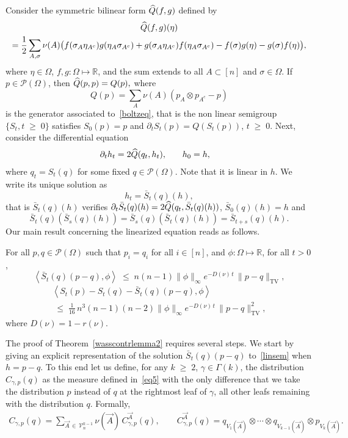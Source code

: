 \documentclass[AHL,Unicode,longabstracts,published]{cedram}
\renewcommand{\leq}{\;\leqslant\;}
\renewcommand{\geq}{\;\geqslant\;}
\newcommand{\Om}{\Omega}
\newcommand{\si}{\sigma}
\newcommand{\tv}{\mathrm{TV}}
\newcommand{\cP}{\mathcal{P}}
\newcommand{\cV}{\mathcal{V}}
\newcommand{\bbR}{\mathbb{R}}
\let\g=\gamma
\let\G=\Gamma
\let\O=\Omega
\let\oldhat\hat
\renewcommand*{\hat}[1]{\mathchoice{\widehat{#1}}{\widehat{#1}}{\oldhat{#1}}{\oldhat{#1}}}
\begin{document}
Consider the symmetric bilinear form $\hat{Q}(f,g)$ defined by
\begin{multline}
 \hat{Q}(f,g)(\eta)\\
=
\frac{1}{2}\sum_{A,\si}
\nu(A)\big(f(\sigma_{A} \eta_{A^c}) g(\eta_{A}\sigma_{A^c}) + g(\sigma_{A} \eta_{A^c})f(\eta_{A}\sigma_{A^c}) - f(\sigma)g(\eta)- g(\sigma)f(\eta)\big),
\end{multline}
where $\eta \in \Om$, $f,g:\O\mapsto\bbR$, and the sum extends to all $A \subset [n]$ and $\si \in \O$.
If $p \in \cP(\O)$, then $\hat{Q}(p,p) = Q(p),$ where
\[
Q(p)=\sum_A\nu(A)(p_A\otimes p_{A^c} - p)
\]
is the generator associated to~\eqref{boltzeq}, that is the non linear semigroup $\{S_t, t \geq 0\}$ satisfies $S_0 (p)= p$ and $\partial_t S_t (p)= Q (S_t (p))$, $t\geq 0$.
Next, consider the differential equation
\begin{align}\label{linsem}
&\partial_t h_t = 2\hat{Q}(q_t,h_t), \ \ \ \;\;\; h_0=h,
\end{align}
where $q_t = S_t(q)$ for some fixed $ q \in \cP(\O)$. Note that it is linear in $h$.
We write its unique solution as
\[
h_t=\bar{S}_t(q)(h),
\]
that is $\bar{S}_t(q)(h)$ verifies $\partial_t \bar{S}_t(q)(h) = 2\hat{Q}(q_t,\bar{S}_t(q)(h))$, $\bar{S}_0(q)(h)=h$ and
\[
\bar{S}_t(q)(\bar{S}_s(q)(h)) = \bar{S}_s(q)(\bar{S}_t(q)(h)) = \bar{S}_{t+s}(q)(h).
\]
Our main result concerning the linearized equation reads as follows.

\begin{theo}\label{wasscontrlemma2}
For all $p,q \in \cP(\O)$ such that $p_{i} = q_{i}$ for all $i \in [n]$, and $\phi:\O\mapsto\bbR$, for all $t>0$,
\begin{equation}\label{nonlincont2}
\left\langle \bar{S}_t(q)(p-q),\phi\right\rangle  \leq n(n-1)\|\phi\|_{\infty}e^{-D(\nu) \,t}\,\|p-q\|_\tv,
\end{equation}
\begin{multline}\label{nonlincont3}
\left\langle S_t(p)-S_t(q)-\bar{S}_t(q)(p-q),\phi\right\rangle \\
\leq \frac1{16}\,n^3(n-1)(n-2) \|\phi\|_{\infty}e^{-D(\nu) \,t}\,\|p-q\|_\tv^2, 
\end{multline}
where $D(\nu)= 1-r(\nu)$.
\end{theo}

The proof of Theorem~\ref{wasscontrlemma2} requires several steps. We start by giving an explicit representation of the solution $\bar{S}_t(q)(p-q)$ to~\eqref{linsem} when $h=p-q$. To this end let us define, for any $k\geq 2$, $\g\in\G(k)$, the distribution $C_{\gamma, p}(q)$ as the measure defined in~\eqref{eq5} with the only difference that we take the distribution $p$ instead of $q$ at the rightmost leaf of $\g$, all other leafs remaining with the distribution $q$. Formally,
\begin{align}\label{eqab5}
C_{\gamma,p}(q)= \sum_{\vec A\,\in\,\cV_n^{k-1}}\nu(\vec A) \,C^{\vec A}_{\gamma,p}(q),\qquad C^{\vec A}_{\gamma,p}(q) = q_{V_1(\vec A)}\otimes\cdots\otimes q_{V_{k-1}(\vec A)}\otimes p_{V_{k}(\vec A)}.
\end{align}
\end{document}
